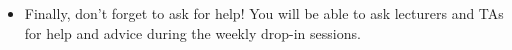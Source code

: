\documentclass[11pt]{report}
\begin{document}
\begin{itemize}
	
	\item Finally, don't forget to ask for help! You will be able to ask lecturers and TAs for help and advice during the weekly drop-in sessions. 
\end{itemize}

    
\newpage
\end{document}
